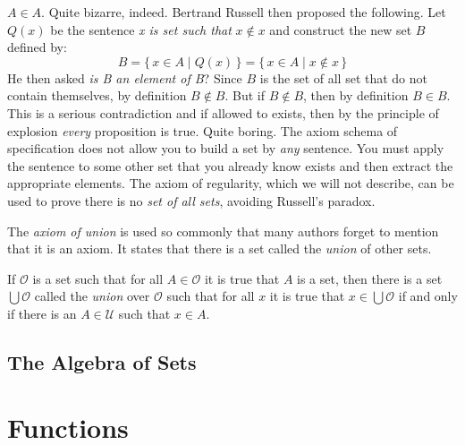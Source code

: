             $A\in{A}$. Quite bizarre, indeed. Bertrand Russell then proposed
            the following. Let $Q(x)$ be the sentence
            \textit{x is set such that} $x\notin{x}$ and construct the new
            set $B$ defined by:
            \begin{equation}
                B=\{\,x\in{A}\;|\;Q(x)\,\}=\{\,x\in{A}\;|\;x\notin{x}\,\}
            \end{equation}
            He then asked \textit{is B an element of B}? Since $B$ is the
            set of all set that do not contain themselves, by definition
            $B\notin{B}$. But if $B\notin{B}$, then by definition $B\in{B}$.
            This is a serious contradiction and if allowed to exists, then by
            the principle of explosion \textit{every} proposition is true.
            Quite boring. The axiom schema of specification does not allow you
            to build a set by \textit{any} sentence. You must apply the
            sentence to some other set that you already know exists and then
            extract the appropriate elements. The axiom of regularity, which
            we will not describe, can be used to prove there is no
            \textit{set of all sets}, avoiding Russell's paradox.
            \par\hfill\par
            The \textit{axiom of union} is used so commonly that many authors
            forget to mention that it is an axiom. It states that there is a
            set called the \textit{union} of other sets.
            \begin{axiom}
                If $\mathcal{O}$ is a set such that for all $A\in\mathcal{O}$ it
                is true that $A$ is a set, then there is a set
                $\bigcup\mathcal{O}$ called the \textit{union} over
                $\mathcal{O}$ such that for all $x$ it is true that
                $x\in\bigcup\mathcal{O}$ if and only if there is an
                $A\in\mathcal{U}$ such that $x\in{A}$.
            \end{axiom}
        \subsection{The Algebra of Sets}
    \section{Functions}
